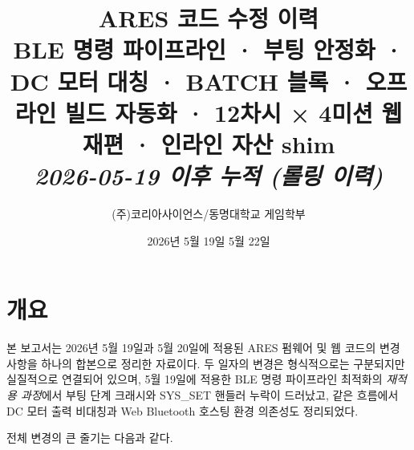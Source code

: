 \documentclass[11pt, oneside]{article}
\title{%
  {\sffamily\bfseries\fontsize{20}{24}\selectfont\color{deepblue}ARES 코드 수정 이력}\\[4pt]
  {\rmfamily\normalsize\color{accentcopper}BLE 명령 파이프라인 · 부팅 안정화 · DC 모터 대칭 · BATCH 블록 · 오프라인 빌드 자동화 · 12차시 × 4미션 웹 재편 · 인라인 자산 shim}\\[2pt]
  {\rmfamily\footnotesize\color{rulegray}\textit{2026-05-19 이후 누적 (롤링 이력)}}
}
\author{\sffamily (주)코리아사이언스\quad/\quad 동명대학교 게임학부}
\date{2026년 5월 19일 \textendash{} 5월 22일}
\begin{document}
\maketitle
\thispagestyle{plain}

\section{개요}

본 보고서는 2026년 5월 19일과 5월 20일에 적용된 ARES 펌웨어 및 웹 코드의
변경 사항을 하나의 합본으로 정리한 자료이다. 두 일자의 변경은 형식적으로는
구분되지만 실질적으로 연결되어 있으며, 5월 19일에 적용한 BLE 명령
파이프라인 최적화의 \emph{재적용 과정}에서 부팅 단계 크래시와 SYS\_SET
핸들러 누락이 드러났고, 같은 흐름에서 DC 모터 출력 비대칭과 Web Bluetooth
호스팅 환경 의존성도 정리되었다.

전체 변경의 큰 줄기는 다음과 같다.
\end{document}

